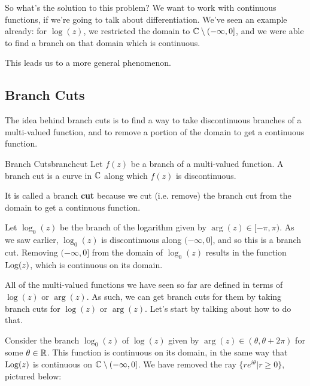 So what's the solution to this problem? We want to work with continuous functions, if we're going to talk about differentiation. We've seen an example already: for $\log(z)$, we restricted the domain to $\mathbb{C}\setminus (-\infty,0]$, and we were able to find a branch on that domain which is continuous.

This leads us to a more general phenomenon.

\subsection{Branch Cuts}

The idea behind branch cuts is to find a way to take discontinuous branches of a multi-valued function, and to remove a portion of the domain to get a continuous function.

\begin{defbo}{Branch Cuts}{branchcut} Let $f(z)$ be a branch of a multi-valued function. A branch cut is a curve in $\mathbb{C}$ along which $f(z)$ is discontinuous.\end{defbo}

It is called a branch {\bf cut} because we cut (i.e. remove) the branch cut from the domain to get a continuous function.

\begin{ex}{}{} Let $\log_0(z)$ be the branch of the logarithm given by $\arg(z) \in [-\pi,\pi)$. As we saw earlier, $\log_0(z)$ is discontinuous along $(-\infty,0]$, and so this is a branch cut. Removing $(-\infty,0]$ from the domain of $\log_0(z)$ results in the function $\mathrm{Log}(z)$, which is continuous on its domain.
\end{ex}

All of the multi-valued functions we have seen so far are defined in terms of $\log(z)$ or $\arg(z)$. As such, we can get branch cuts for them by taking branch cuts for $\log(z)$ or $\arg(z)$. Let's start by talking about how to do that.

Consider the branch $\log_0(z)$ of $\log(z)$ given by $\arg(z) \in (\theta, \theta + 2\pi)$ for some $\theta \in \mathbb{R}$. This function is continuous on its domain, in the same way that $\mathrm{Log}(z)$ is continuous on $\mathbb{C}\setminus(-\infty,0]$. We have removed the ray $\{re^{i\theta}|r\ge 0\}$, pictured below:

\begin{center}
\end{center}

